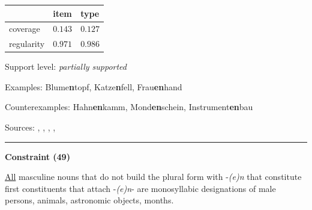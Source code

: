 \vspace{-0.35em}

\begin{table}[!ht]
\begin{center}

\begin{tabularx}{\columnwidth}{|X|X|X|}
\hline
 & item & type \\
\hline
 coverage & $0.143$ & $0.127$ \\
\hline
 regularity & $0.971$ & $0.986$ \\
\hline
\end{tabularx}
\end{center}
\end{table}

\vspace{-1.35em}

\noindent
Support level: \textit{partially supported}

\vspace{0.3em}

\noindent
Examples: Blume\textbf{n}topf, Katze\textbf{n}fell, Frau\textbf{en}hand

\noindent
Counterexamples: Hahn\textbf{en}kamm, Mond\textbf{en}schein, Instrument\textbf{en}bau

\vspace{0.3em}

\noindent
Sources: \citet[187]{kopf_2017}, \citet[118, 119]{kuerschner_2005}, \citet[9]{kuerschner_2010}, \citet[3]{nuebling_szczepaniak_2008}, \citet[79, 84]{nuebling_szczepaniak_2013}


\hrule




\vspace{0.4em}

\begin{center}
\textbf{Constraint (49)}
\end{center}

\noindent
\underline{All} masculine nouns that do not build the plural form with -\textit{(e)n} that constitute first constituents that attach -\textit{(e)n}- are monosyllabic designations of male persons, animals, astronomic objects, months.
\vspace{0.35em}



